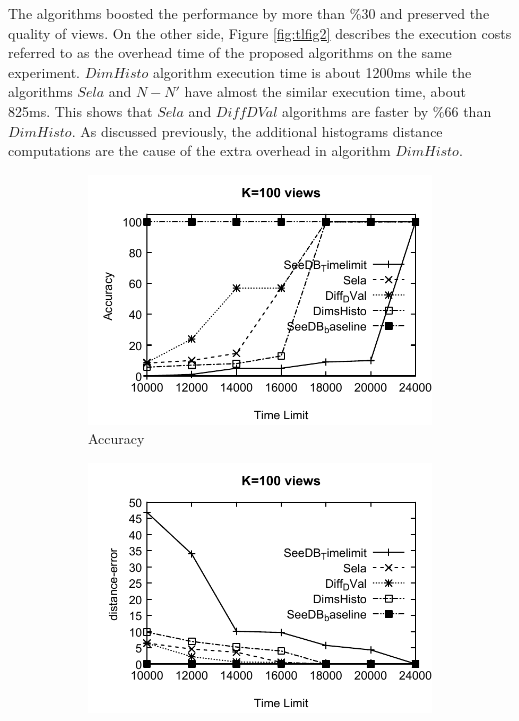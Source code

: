 The algorithms boosted the performance by more than \%30 and preserved the quality of views. 
%
On the other side, Figure \ref{fig:tlfig2} describes the execution costs referred to as the overhead time of the proposed algorithms on the same experiment. 
%
$DimHisto$ algorithm execution time is about 1200ms while the algorithms $Sela$ and $N-N'$ have almost the similar execution time, about 825ms. 
This shows that $Sela$ and $Diff DVal$ algorithms are faster by \%66 than $DimHisto$. 
%
As discussed previously, the additional histograms distance computations are the cause of the extra overhead in algorithm $DimHisto$. 
%
\begin{figure}[t]
  \begin{subfigure}[b]{0.32\textwidth}
    \includegraphics[width=\textwidth]{tl1.pdf}
    \caption{Accuracy}
        \label{fig:tlfig1}%
  \end{subfigure}
	\begin{subfigure}[b]{0.32\textwidth}
    \includegraphics[width=\textwidth]{tl11.pdf}

\end{subfigure}
\end{figure}
